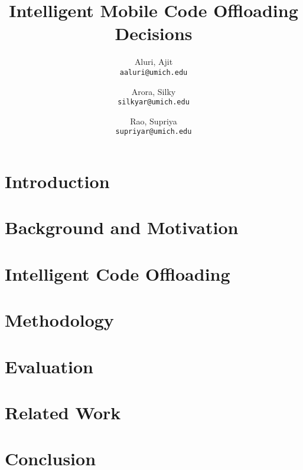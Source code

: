 \documentclass[pageno]{jpaper}
\begin{document}
\title{Intelligent Mobile Code Offloading Decisions}


\author{
  Aluri, Ajit\\
  \texttt{aaluri@umich.edu}
  \and
  Arora, Silky\\
  \texttt{silkyar@umich.edu}
  \and
  Rao, Supriya\\
  \texttt{supriyar@umich.edu}
}

\date{}
\maketitle
\thispagestyle{empty}

\begin{abstract}

\end{abstract}
\section{Introduction}

\section{Background and Motivation}
\label{sec:back}

\section{Intelligent Code Offloading}

\section{Methodology}

\section{Evaluation}
\label{sec:results}

\section{Related Work}
\label{sec:prior}

\section{Conclusion}
\label{sec:conclusion}



\vspace{5mm}

\end{document}
